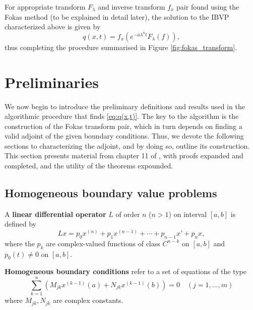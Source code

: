 \documentclass[12pt, oneside, a4paper]{article}
\begin{document}
For appropriate transform $F_\lambda$ and inverse transform $f_x$ pair found using the Fokas method (to be explained in detail later), the solution to the IBVP characterized above is given by \cite[p.15]{Smith2016}
\begin{equation}\label{eq:q(x,t)}
    q(x,t) = f_x(e^{-a\lambda^n t}F_\lambda(f)),
\end{equation}
thus completing the procedure summarised in Figure \ref{fig:fokas_transform}.

\section{Preliminaries}
We now begin to introduce the preliminary definitions and results used in the algorithmic procedure that finds \eqref{eq:q(x,t)}. The key to the algorithm is the construction of the Fokas transform pair, which in turn depends on finding a valid adjoint of the given boundary conditions. Thus, we devote the following sections to characterizing the adjoint, and by doing so, outline its construction. This section presents material from chapter 11 of \cite{CoddingtonLevinson}, with proofs expanded and completed, and the utility of the theorems expounded.

\subsection{Homogeneous boundary value problems}
\begin{defn}\cite[p.81]{CoddingtonLevinson}\label{defn:linear differential operator}
    A \textbf{linear differential operator} $L$ of order $n$ ($n>1$) on interval $[a,b]$ is defined by
    \begin{equation}\label{eq:L}
        Lx = p_0x^{(n)} + p_1x^{(n-1)} + \cdots + p_{n-1}x' + p_nx,
    \end{equation}
    where the $p_k$ are complex-valued functions of class $C^{n-k}$ on $[a,b]$ and $p_0(t)\neq 0$ on $[a,b]$.
\end{defn}

\begin{defn}\cite[p.284]{CoddingtonLevinson}\label{defn:homogeneous boundary conditions}
    \textbf{Homogeneous boundary conditions} refer to a set of equations of the type
    \begin{equation}\label{eq:homogeneous boundary conditions}
        \sum_{k=1}^n (M_{jk}x^{(k-1)}(a) + N_{jk}x^{(k-1)}(b))=0 \quad (j=1,\ldots,m) 
    \end{equation}
    where $M_{jk}, N_{jk}$ are complex constants.
\end{defn}
\end{document}
